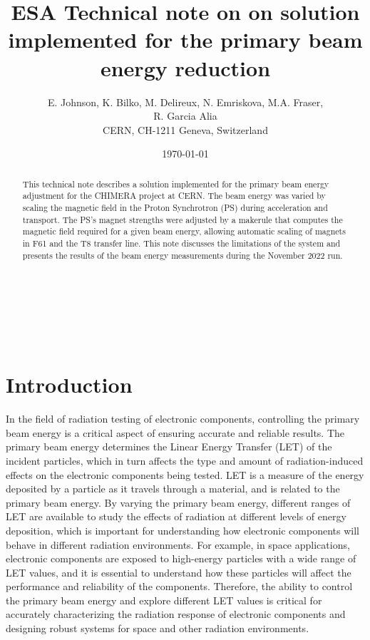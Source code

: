 \documentclass{cernatsnote}
\title{ESA Technical note on on solution implemented for the primary beam energy reduction}
\author{
	E. Johnson, K. Bilko, M. Delireux, N. Emriskova, M.A. Fraser, \\ R. Garcia Alia\; \\		
	CERN, CH-1211 Geneva, Switzerland
}
\date{\today}
\begin{document}
\maketitle

\begin{abstract}
This technical note describes a solution implemented for the primary beam energy adjustment for the CHIMERA project at CERN. The beam energy was varied by scaling the magnetic field in the Proton Synchrotron (PS) during acceleration and transport. The PS's magnet strengths were adjusted by a makerule that computes the magnetic field required for a given beam energy, allowing automatic scaling of magnets in F61 and the T8 transfer line. This note discusses the limitations of the system and presents the results of the beam energy measurements during the November 2022 run.
\end{abstract}
\\ \\ \\ 

\begingroup
\color{black}
\tableofcontents
\endgroup

\pagebreak

\section{Introduction}
In the field of radiation testing of electronic components, controlling the primary beam energy is a critical aspect of ensuring accurate and reliable results. The primary beam energy determines the Linear Energy Transfer (LET) of the incident particles, which in turn affects the type and amount of radiation-induced effects on the electronic components being tested. LET is a measure of the energy deposited by a particle as it travels through a material, and is related to the primary beam energy. By varying the primary beam energy, different ranges of LET are available to study the effects of radiation at different levels of energy deposition, which is important for understanding how electronic components will behave in different radiation environments. For example, in space applications, electronic components are exposed to high-energy particles with a wide range of LET values, and it is essential to understand how these particles will affect the performance and reliability of the components. Therefore, the ability to control the primary beam energy and explore different LET values is critical for accurately characterizing the radiation response of electronic components and designing robust systems for space and other radiation environments.
\end{document}

